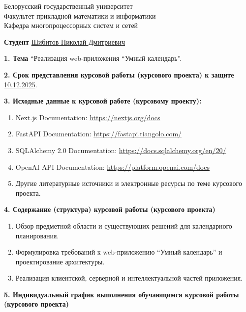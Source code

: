 \documentclass[14pt,a4paper]{extreport}
\begin{document}
\noindent Белорусский государственный университет\\
Факультет прикладной математики и информатики\\
Кафедра многопроцессорных систем и сетей

\vspace{5mm}

\noindent\textbf{Студент} \underline{Шибитов Николай Дмитриевич}

\vspace{3mm}

\noindent\textbf{1. Тема} ``Реализация web-приложения ``Умный календарь''.

\vspace{3mm}

\noindent\textbf{2. Срок представления курсовой работы (курсового проекта) к защите} \underline{10.12.2025}.

\vspace{3mm}

\noindent\textbf{3. Исходные данные к курсовой работе (курсовому проекту):}

\begin{enumerate}
    \item Next.js Documentation: \url{https://nextjs.org/docs}
    \item FastAPI Documentation: \url{https://fastapi.tiangolo.com/}
    \item SQLAlchemy 2.0 Documentation: \url{https://docs.sqlalchemy.org/en/20/}
    \item OpenAI API Documentation: \url{https://platform.openai.com/docs}
    \item Другие литературные источники и электронные ресурсы по теме курсового проекта.
\end{enumerate}

\noindent\textbf{4. Содержание (структура) курсовой работы (курсового проекта)}

\begin{enumerate}
    \item Обзор предметной области и существующих решений для календарного планирования.
    \item Формулировка требований к web-приложению ``Умный календарь'' и проектирование архитектуры.
    \item Реализация клиентской, серверной и интеллектуальной частей приложения.
\end{enumerate}

\noindent\textbf{5. Индивидуальный график выполнения обучающимся курсовой работы (курсового проекта)}
\end{document}
